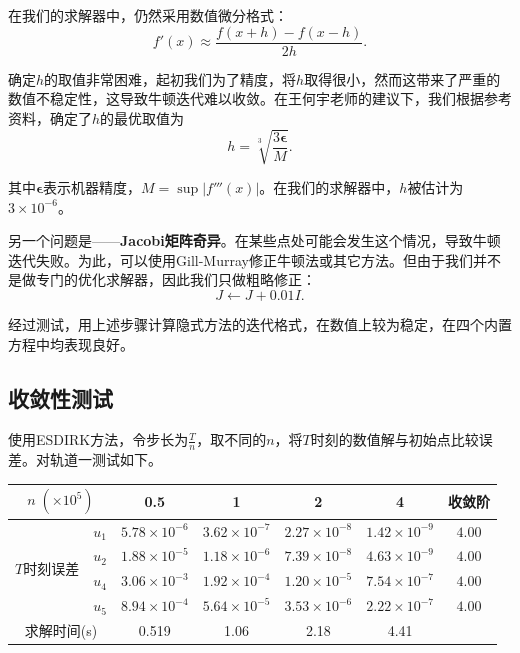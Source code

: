 \documentclass[lang=cn,10pt,bibend=bibtex]{elegantbook}
\begin{document}
在我们的求解器中，仍然采用数值微分格式：
\begin{equation}
  f'(x)\approx \frac{f(x+h)-f(x-h)}{2h}.
\end{equation}

确定$h$的取值非常困难，起初我们为了精度，将$h$取得很小，然而这带来了严重的数值不稳定性，这导致牛顿迭代难以收敛。在王何宇老师的建议下，我们根据参考资料\cite{叶兴德2008数值分析基础}，确定了$h$的最优取值为
\begin{equation}
  h=\sqrt[3]{\frac{3\mathbf{\epsilon}}{M}}.
\end{equation}

其中$\mathbf{\epsilon}$表示机器精度，$M=\sup |f'''(x)|$。在我们的求解器中，$h$被估计为$3\times 10^{-6}$。

另一个问题是——\textbf{Jacobi矩阵奇异}。在某些点处可能会发生这个情况，导致牛顿迭代失败。为此，可以使用Gill-Murray修正牛顿法\cite{1974Newton}或其它方法。但由于我们并不是做专门的优化求解器，因此我们只做粗略修正：
\begin{equation}
  J\gets J+0.01I.
\end{equation}

经过测试，用上述步骤计算隐式方法的迭代格式，在数值上较为稳定，在四个内置方程中均表现良好。

\subsection{收敛性测试}

使用ESDIRK方法，令步长为$\frac{T}{n}$，取不同的$n$，将$T$时刻的数值解与初始点比较误差。对轨道一测试如下。

\begin{table}[htbp]
  \centering
  \renewcommand\arraystretch{1.1}
  \begin{tabular}{cc|cccc|c}
  \multicolumn{2}{c|}{$n\;(\times 10^5)$}                  & 0.5 & 1 & 2 & 4  & 收敛阶 \\ \hline
  \multicolumn{1}{c|}{\multirow{4}{*}{$T$时刻误差}} & \multicolumn{1}{c|}{$u_1$} & $5.78\times 10^{-6}$ &  $3.62\times 10^{-7}$  & $2.27\times 10^{-8}$  & $1.42\times 10^{-9}$    &  $4.00$   \\
  \multicolumn{1}{c|}{}                         & \multicolumn{1}{c|}{$u_2$} & $1.88\times 10^{-5}$ &  $1.18\times 10^{-6}$     & $7.39\times 10^{-8}$  & $4.63\times 10^{-9}$    &  $4.00$   \\
  \multicolumn{1}{c|}{}                         & \multicolumn{1}{c|}{$u_4$} & $3.06\times 10^{-3}$ &  $1.92\times 10^{-4}$     & $1.20\times 10^{-5}$  & $7.54\times 10^{-7}$     &  $4.00$   \\
  \multicolumn{1}{c|}{}                         & \multicolumn{1}{c|}{$u_5$} & $8.94\times 10^{-4}$ &  $5.64\times 10^{-5}$     & $3.53\times 10^{-6}$  & $2.22\times 10^{-7}$     &  $4.00$  \\ \hline
  \multicolumn{2}{c|}{求解时间(s)} & 0.519 & 1.06 & 2.18 & 4.41 & 
  \end{tabular}
\end{table}
\end{document}
